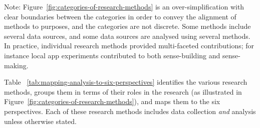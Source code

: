 Note: Figure~\ref{fig:categories-of-research-methods} is an over-simplification with clear boundaries between the categories in order to convey the alignment of methods to purposes, and the categories are not discrete.  Some methods include several data sources, and some data sources are analysed using several methods. In practice, individual research methods provided multi-faceted contributions; for instance local app experiments contributed to both sense-building and sense-making. 


\medskip


Table ~\ref{tab:mapping-analysis-to-six-perspectives} identifies the various research methods, groups them in terms of their roles in the research (as illustrated in Figure~\ref{fig:categories-of-research-methods}), and maps them to the six perspectives.  Each of these research methods includes data collection \textit{and} analysis unless otherwise stated.


